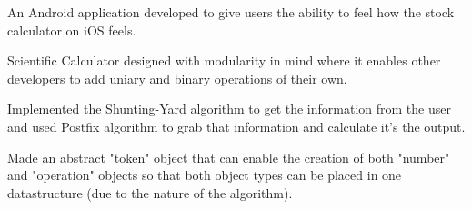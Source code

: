 \documentclass[]{dans-resume}
\begin{document}
\begin{minipage}[t]{0.66\textwidth}
\vspace{\topsep}
\begin{tightemize}
    \item An Android application developed to give users the ability to feel how the stock
    calculator on iOS feels.
    \item Scientific Calculator designed with modularity in mind where it enables other
    developers to add uniary and binary operations of their own.
    \item Implemented the Shunting-Yard algorithm to get the information from the user
    and used Postfix algorithm to grab that information and calculate it's the output.
    \item Made an abstract "token" object that can enable the creation of both "number" and
    "operation" objects so that both object types can be placed in one datastructure (due
    to the nature of the algorithm).
\end{tightemize}
\sectionsep


\end{minipage}
\end{document}
